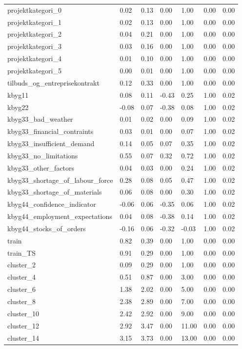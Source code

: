 \begin{landscape}
\begin{longtable}[h!]{lllllll}
projektkategori_0 & 0.02 & 0.13 & 0.00 & 1.00 & 0.00 & 0.00 \\
projektkategori_1 & 0.02 & 0.13 & 0.00 & 1.00 & 0.00 & 0.00 \\
projektkategori_2 & 0.04 & 0.21 & 0.00 & 1.00 & 0.00 & 0.00 \\
projektkategori_3 & 0.03 & 0.16 & 0.00 & 1.00 & 0.00 & 0.00 \\
projektkategori_4 & 0.01 & 0.10 & 0.00 & 1.00 & 0.00 & 0.00 \\
projektkategori_5 & 0.00 & 0.01 & 0.00 & 1.00 & 0.00 & 0.00 \\
tilbuds_og_entreprisekontrakt & 0.12 & 0.33 & 0.00 & 1.00 & 0.00 & 0.00 \\
kbyg11 & 0.08 & 0.11 & -0.43 & 0.25 & 1.00 & 0.02 \\
kbyg22 & -0.08 & 0.07 & -0.38 & 0.08 & 1.00 & 0.02 \\
kbyg33_bad_weather & 0.01 & 0.02 & 0.00 & 0.09 & 1.00 & 0.02 \\
kbyg33_financial_contraints & 0.03 & 0.01 & 0.00 & 0.07 & 1.00 & 0.02 \\
kbyg33_insufficient_demand & 0.14 & 0.05 & 0.07 & 0.35 & 1.00 & 0.02 \\
kbyg33_no_limitations & 0.55 & 0.07 & 0.32 & 0.72 & 1.00 & 0.02 \\
kbyg33_other_factors & 0.04 & 0.03 & 0.00 & 0.24 & 1.00 & 0.02 \\
kbyg33_shortage_of_labour_force & 0.28 & 0.08 & 0.05 & 0.47 & 1.00 & 0.02 \\
kbyg33_shortage_of_materials & 0.06 & 0.08 & 0.00 & 0.30 & 1.00 & 0.02 \\
kbyg44_confidence_indicator & -0.06 & 0.06 & -0.35 & 0.06 & 1.00 & 0.02 \\
kbyg44_employment_expectations & 0.04 & 0.08 & -0.38 & 0.14 & 1.00 & 0.02 \\
kbyg44_stocks_of_orders & -0.16 & 0.06 & -0.32 & -0.03 & 1.00 & 0.02 \\
train & 0.82 & 0.39 & 0.00 & 1.00 & 0.00 & 0.00 \\
train_TS & 0.91 & 0.29 & 0.00 & 1.00 & 0.00 & 0.00 \\
cluster_2 & 0.09 & 0.29 & 0.00 & 1.00 & 0.00 & 0.00 \\
cluster_4 & 0.51 & 0.87 & 0.00 & 3.00 & 0.00 & 0.00 \\
cluster_6 & 1.38 & 2.02 & 0.00 & 5.00 & 0.00 & 0.00 \\
cluster_8 & 2.38 & 2.89 & 0.00 & 7.00 & 0.00 & 0.00 \\
cluster_10 & 2.42 & 2.92 & 0.00 & 9.00 & 0.00 & 0.00 \\
cluster_12 & 2.92 & 3.47 & 0.00 & 11.00 & 0.00 & 0.00 \\
cluster_14 & 3.15 & 3.73 & 0.00 & 13.00 & 0.00 & 0.00 \\
\end{longtable}\end{landscape}
